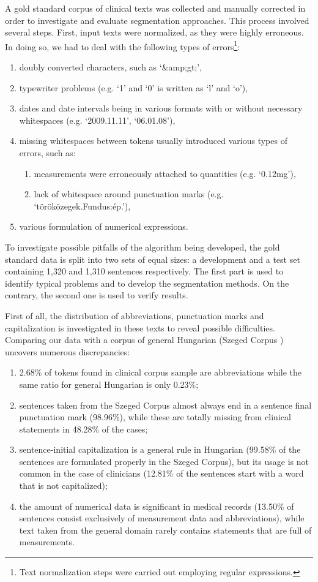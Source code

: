 A gold standard corpus of clinical texts was collected and manually corrected in order to investigate and evaluate segmentation approaches.
This process involved several steps. 
First, input texts were normalized, as they were highly erroneous.
In doing so, we had to deal with the following types of errors\footnote{Text normalization steps were carried out employing regular expressions.}:
\begin{enumerate}
 \item doubly converted characters, such as `\&amp;gt;',
 \item typewriter problems (e.g. `1' and `0' is written as `l' and `o'),
 \item dates and date intervals being in various formats with or without necessary whitespaces (e.g. `2009.11.11', `06.01.08'),
 \item missing whitespaces between tokens usually introduced various types of errors, such as:
 \begin{enumerate}
  \item measurements were erroneously attached to quantities (e.g. `0.12mg'),
  \item lack of whitespace around punctuation marks (e.g. `töröközegek.Fundus:ép.'),
 \end{enumerate}
 \item various formulation of numerical expressions.
\end{enumerate}
 
To investigate possible pitfalls of the algorithm being developed, the gold standard data is split into two sets of equal sizes: a development and a test set containing 1,320 and 1,310 sentences respectively. 
The first part is used to identify typical problems and to develop the segmentation methods. 
On the contrary, the second one is used to verify results. 

First of all, the distribution of abbreviations, punctuation marks and capitalization is investigated in these texts to reveal possible difficulties. 
Comparing our data with a corpus of general Hungarian (Szeged Corpus \cite{Csendes2004}) uncovers numerous discrepancies: 
\begin{enumerate}
 \item 2.68\% of tokens found in clinical corpus sample are abbreviations while the same ratio for general Hungarian is only 0.23\%; 
 \item sentences taken from the Szeged Corpus almost always end in a sentence final punctuation mark (98.96\%), while these are totally missing from clinical statements in 48.28\% of the cases; 
 \item sentence-initial capitalization is a general rule in Hungarian (99.58\% of the sentences are formulated properly in the Szeged Corpus), but its usage is not common in the case of clinicians (12.81\% of the sentences start with a word that is not capitalized); 
 \item the amount of numerical data is significant in medical records (13.50\% of sentences consist exclusively of measurement data and abbreviations), while text taken from the general domain rarely contains statements that are full of measurements. 
\end{enumerate}

